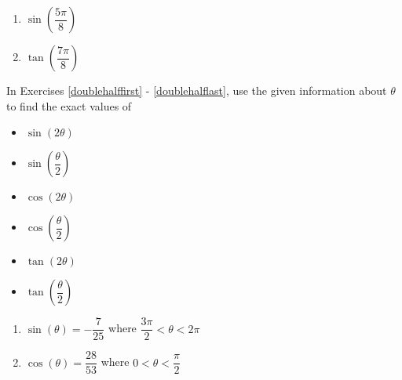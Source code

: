\begin{multicols}{2}

\begin{enumerate}

\setcounter{enumi}{\value{HW}}

\item $\sin \left( \dfrac{5\pi}{8} \right)$
\item $\tan \left( \dfrac{7\pi}{8} \right)$ \label{idenhalfanglelast}

\setcounter{HW}{\value{enumi}}

\end{enumerate}

\end{multicols}

\pagebreak

In Exercises \ref{doublehalffirst} - \ref{doublehalflast}, use the given information about $\theta$ to find the exact values of 

\begin{multicols}{3}

\begin{itemize}

\item $\sin(2\theta)$
\item $\sin\left(\dfrac{\theta}{2}\right)$
\item $\cos(2\theta)$
\item $\cos\left(\dfrac{\theta}{2}\right)$
\item $\tan(2\theta)$
\item $\tan\left(\dfrac{\theta}{2}\right)$

\end{itemize}

\end{multicols}

\begin{multicols}{2}

\begin{enumerate}

\setcounter{enumi}{\value{HW}}

\item $\sin(\theta) = -\dfrac{7}{25}$ where $\dfrac{3\pi}{2} < \theta < 2\pi$ \label{doublehalffirst}
\item $\cos(\theta) = \dfrac{28}{53}$ where $0 < \theta < \dfrac{\pi}{2}$

\setcounter{HW}{\value{enumi}}

\end{enumerate}

\end{multicols}

